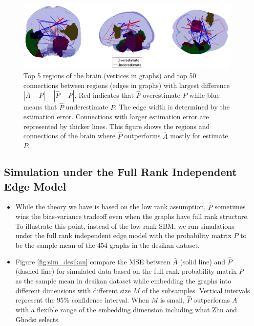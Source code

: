 \documentclass[a4paper]{article}
\begin{document}
%

\begin{figure}[!htb]
\centering
\includegraphics[width=1\textwidth]{Diff_between_desikan.png}
\caption{Top 5 regions of the brain (vertices in graphs) and top 50 connections between regions (edges in graphs) with largest difference $|\bar{A} - P| - |\hat{P} - P|$. Red indicates that $\hat{P}$ overestimate $P$ while blue means that $\hat{P}$ underestimate $P$. The edge width is determined by the estimation error. Connections with larger estimation error are represented by thicker lines. This figure shows the regions and connections of the brain where $\hat{P}$ outperforms $\bar{A}$ mostly for estimate $P$.}
\label{fig:Diff_between_desikan}
\end{figure}




\subsection{Simulation under the Full Rank Independent Edge Model}
\begin{itemize}
\item While the theory we have is based on the low rank assumption, $\hat{P}$ sometimes wins the bias-variance tradeoff even when the graphs have full rank structure. To illustrate this point, instead of the low rank SBM, we run simulations under the full rank independent edge model with the probability matrix $P$ to be the sample mean of the 454 graphs in the desikan dataset.
\item Figure \ref{fig:sim_desikan} compare the MSE between $\bar{A}$ (solid line) and $\hat{P}$ (dashed line) for simulated data based on the full rank probability matrix $P$ as the sample mean in desikan dataset while embedding the graphs into different dimensions with different size $M$ of the subsamples. Vertical intervals represent the 95\% confidence interval. When $M$ is small, $\hat{P}$ outperforms $\bar{A}$ with a flexible range of the embedding dimension including what Zhu and Ghodsi selects.
\end{itemize}
\end{document}

